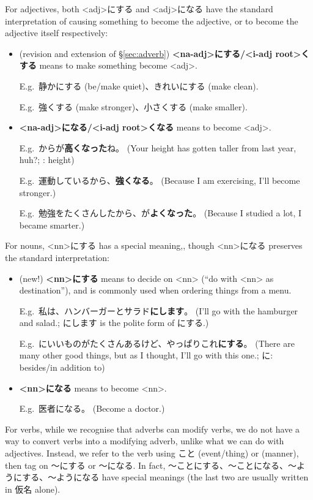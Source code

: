 \documentclass[../nihongo-gakushuu-kyouzai.tex]{subfiles}
\begin{document}
For adjectives, both <adj>にする and <adj>になる have the standard interpretation of causing something to become the adjective, or to become the adjective itself respectively:
\begin{itemize}
    \item (revision and extension of \S\ref{sec:adverb}) \textbf{<na-adj>にする/<i-adj root>くする} means to make something become <adj>.

    E.g.\ 静かにする (be/make quiet)、きれいにする (make clean).

    E.g.\ 強くする (make stronger)、小さくする (make smaller).
    \item \textbf{<na-adj>になる/<i-adj root>くなる} means to become <adj>.

    E.g.\ からが\textbf{高くなった}ね。 (Your height has gotten taller from last year, huh?; : height)

    E.g.\ 運動しているから、\textbf{強くなる}。 (Because I am exercising, I'll become stronger.)

    E.g.\ 勉強をたくさんしたから、が\textbf{よくなった}。 (Because I studied a lot, I became smarter.)
\end{itemize}

For nouns, <nn>にする has a special meaning,, though <nn>になる preserves the standard interpretation:
\begin{itemize}
    \item (new!) \textbf{<nn>にする} means to decide on <nn> (``do with <nn> as destination''), and is commonly used when ordering things from a menu.

    E.g.\ 私は、ハンバーガーとサラド\textbf{にします}。 (I'll go with the hamburger and salad.; にします is the polite form of にする.)

    E.g.\ にいいものがたくさんあるけど、やっぱりこれ\textbf{にする}。 (There are many other good things, but as I thought, I'll go with this one.; に: besides/in addition to)
    \item \textbf{<nn>になる} means to become <nn>.

    E.g.\ 医者になる。 (Become a doctor.)
\end{itemize}

For verbs, while we recognise that adverbs can modify verbs, we do not have a way to convert verbs into a modifying adverb, unlike what we can do with adjectives. Instead, we refer to the verb using こと (event/thing) or  (manner), then tag on 〜にする or 〜になる. In fact, 〜ことにする、〜ことになる、〜ようにする、〜ようになる have special meanings (the last two are usually written in 仮名 alone).
\end{document}
